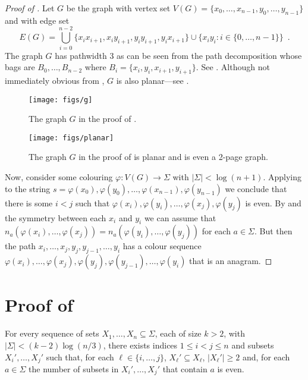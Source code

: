\documentclass{patmorin}
\begin{document}
\begin{proof}[Proof of ]
  Let $G$ be the graph with vertex set
  $V(G)=\{x_0,\ldots,x_{n-1},y_0,\ldots,y_{n-1}\}$ and with edge set
  \[
    E(G) = \bigcup_{i=0}^{n-2} \{x_ix_{i+1},x_iy_{i+1},y_iy_{i+1},y_ix_{i+1}\} 
           \cup \{x_iy_i : i\in\{0,\ldots,n-1\}\} \enspace .
  \]
  The graph $G$ has pathwidth 3 as can be seen from the path decomposition
  whose bags are
  $B_0,\ldots,B_{n-2}$ where $B_i=\{x_i,y_i,x_{i+1},y_{i+1}\}$.  See
  . Although not immediately obvious from ,
  $G$ is also planar---see .
  
  \begin{figure}
    \begin{center}
      \texttt{[image: figs/g]}
    \end{center}
    \caption{The graph $G$ in the proof of .}
  \end{figure}
  
  \begin{figure}
    \begin{center}
      \texttt{[image: figs/planar]}
    \end{center}
    \caption{The graph $G$ in the proof of  is planar
     and is even a 2-page graph.}
  \end{figure}
  
  Now, consider some colouring $\varphi:V(G)\to\Sigma$
  with $|\Sigma| < \log(n+1)$.  Applying  to
  the string 
  $s=\varphi(x_0),\varphi(y_0),\ldots,\varphi(x_{n-1}),\varphi(y_{n-1})$ we
  conclude that there is some $i < j$ such that 
  $\varphi(x_{i}),\varphi(y_i),\ldots,\varphi(x_j),\varphi(y_j)$
  is even.  By  and the
  symmetry between each $x_i$ and $y_i$ we can assume that
  $n_a(\varphi(x_i),\ldots,\varphi(x_j))=n_a(\varphi(y_i),\ldots,\varphi(y_j))$
  for each $a\in\Sigma$.  But then the path
  $x_i,\ldots,x_j,y_j,y_{j-1},\ldots,y_i$ has a colour sequence
  $\varphi(x_i),\ldots,\varphi(x_j),\varphi(y_j),\varphi(y_{j-1}),\ldots,\varphi(y_i)$
  that is an anagram.
\end{proof}

\section{Proof of }

\begin{lem}
   For every sequence of sets $X_1,\ldots,X_n\subseteq\Sigma$, each of
   size $k>2$, with $|\Sigma|< (k-2)\log(n/3)$, there exists indices
   $1\le i< j\le n$ and subsets $X_i',\ldots,X_j'$ such that, for each
   $\ell\in\{i,\ldots,j\}$,  $X_\ell'\subseteq X_\ell$, $|X_\ell'|\ge 2$
   and, for each $a\in\Sigma$ the number of subsets in $X_i',\ldots,X_j'$
   that contain $a$ is even.
\end{lem}
\end{document}
